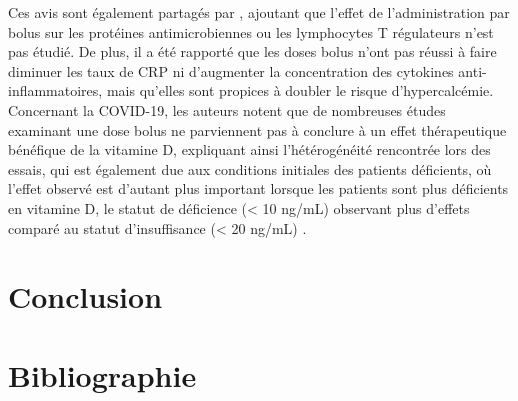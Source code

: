 \documentclass[
  a4paper,
  DIV=11,
  numbers=noendperiod,
  listof=totoc]{scrreprt}
\begin{document}
Ces avis sont également partagés par \textcite{Mazess.2021}, ajoutant
que l'effet de l'administration par bolus sur les protéines
antimicrobiennes ou les lymphocytes T régulateurs n'est pas étudié. De
plus, il a été rapporté que les doses bolus n'ont pas réussi à faire
diminuer les taux de \ac{CRP} ni d'augmenter la concentration des
cytokines anti-inflammatoires, mais qu'elles sont propices à doubler le
risque d'hypercalcémie. Concernant la COVID-19, les auteurs notent que
de nombreuses études examinant une dose bolus ne parviennent pas à
conclure à un effet thérapeutique bénéfique de la vitamine D, expliquant
ainsi l'hétérogénéité rencontrée lors des essais, qui est également due
aux conditions initiales des patients déficients, où l'effet observé est
d'autant plus important lorsque les patients sont plus déficients en
vitamine D, le statut de déficience (\textless{} 10 ng/mL) observant
plus d'effets comparé au statut d'insuffisance (\textless{} 20 ng/mL)
\autocite{Mazess.2021}.

\newpage{}

\chapter{Conclusion}\label{conclusion}

\newpage{}

\hypertarget{Bibliographie}{%
\chapter*{\centering Bibliographie}\label{Bibliographie}}
\singlespace

\printbibliography[heading=none]
\end{document}
